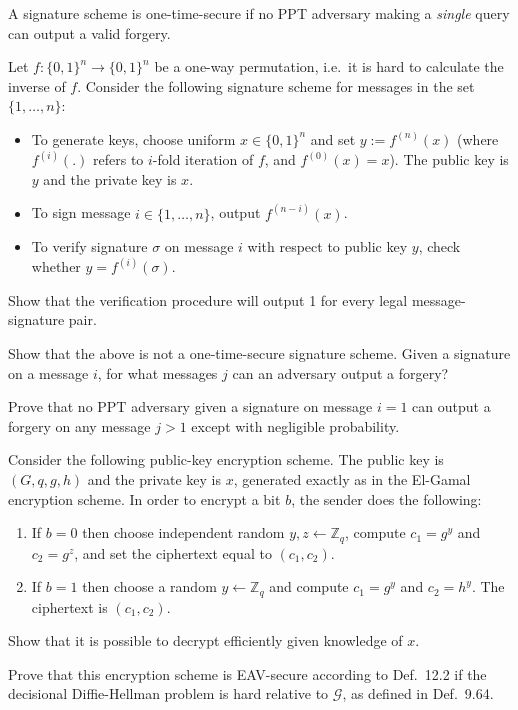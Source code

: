 \documentclass[a4paper,10pt,landscape,twocolumn]{scrartcl}
\begin{document}
\begin{exercise}
A signature scheme is one-time-secure if no PPT adversary making a \emph{single} query can output a valid forgery.

Let $f: \{0,1\}^n \rightarrow \{0,1\}^n$ be a one-way permutation, i.e.~it is hard to calculate the inverse of $f$. Consider the following signature
scheme for messages in the set $\{1,\dots , n\}$:
\begin{itemize}
\item To generate keys, choose uniform $x \in \{0, 1\}^n$ and set $y := f^{(n)} (x)$
(where $f^{(i)}(.)$ refers to $i$-fold iteration of $f$, and $f^{(0)} (x) = x$). The
public key is $y$ and the private key is $x$.
\item To sign message $i \in \{1,\dots , n\}$, output $f^{(n-i)} (x)$.
\item To verify signature $\sigma$ on message $i$ with respect to public key $y$,
check whether $y = f^{(i)} (\sigma)$.
\end{itemize}

\begin{subex}
Show that the verification procedure will output 1 for every legal message-signature pair.
\end{subex}
\begin{subex}
Show that the above is not a one-time-secure signature scheme.
Given a signature on a message $i$, for what messages $j$ can an
adversary output a forgery?
\end{subex}
\begin{subex}
Prove that no PPT adversary given a signature on message $i=1$ can output a forgery on any message $j > 1$ except with negligible probability.
\end{subex}
\end{exercise}

\begin{exercise}
	Consider the following public-key encryption scheme. The public key is $(G,q,g,h)$ and the private key is $x$, generated exactly as in the El-Gamal encryption scheme. In order to encrypt a bit $b$, the sender does the following:
	\begin{enumerate}
		\item If $b=0$ then choose independent random $y,z \leftarrow \mathbb{Z}_q$, compute $c_1 = g^y$ and $c_2 = g^z$, and set the ciphertext equal to $(c_1, c_2)$.
		\item If $b = 1$ then choose a random $y\leftarrow \mathbb{Z}_q$ and compute $c_1 =g^y$ and $c_2 = h^y$. The ciphertext is $(c_1, c_2)$.
	\end{enumerate}
\begin{subex}                
	Show that it is possible to decrypt efficiently given
        knowledge of $x$.
      \end{subex}
\begin{subex}
      Prove that this encryption scheme is EAV-secure according to Def.~12.2 if the
      decisional Diffie-Hellman problem is hard relative to
      $\mathcal{G}$, as defined in Def.~9.64.
    \end{subex}
\end{exercise}
\end{document}
